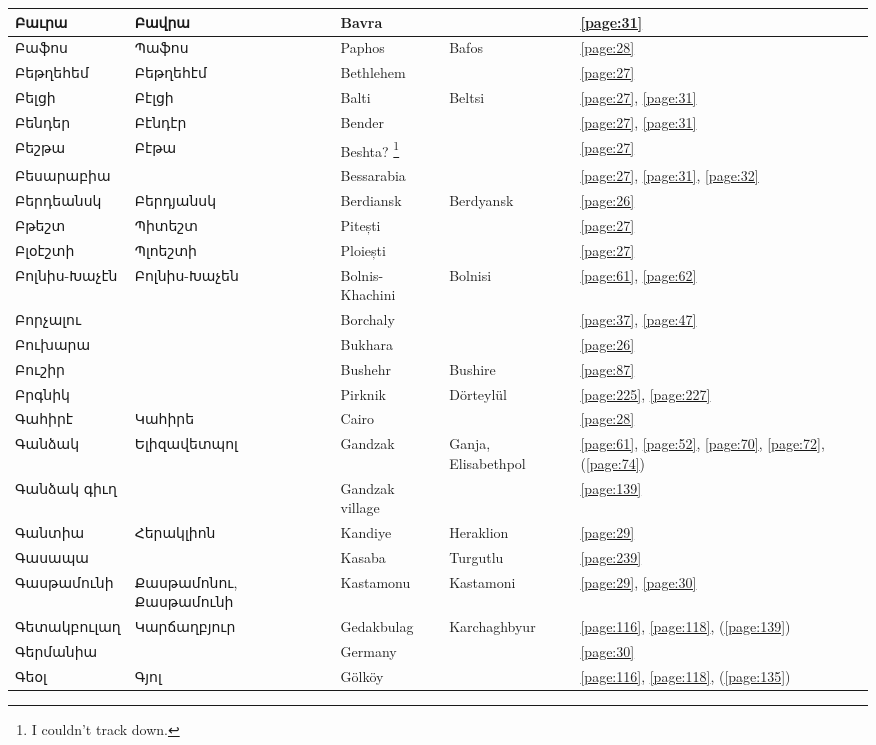 \begin{center}
\begin{longtable}{|p{}|p{3cm}|p{3cm}|p{2cm}|p{3cm}|}
Բաւրա& Բավրա
& {Bavra}& &\ref{page:31}\\ \hline
Բաֆոս&Պաֆոս
& {Paphos}& Bafos&\ref{page:28}\\ \hline
Բեթղեհեմ&Բեթղեհէմ &
Bethlehem& &\ref{page:27}\\ \hline
Բելցի& Բէլցի&
{Balti}& Beltsi&\ref{page:27}, \ref{page:31}\\ \hline
Բենդեր& Բէնդէր&
{Bender}& &\ref{page:27}, \ref{page:31}\\ \hline
Բեշթա& Բէթա& 
{Beshta?} \footnote{I couldn't track down.}& &\ref{page:27}\\ \hline
Բեսարաբիա&  &Bessarabia & &\ref{page:27}, \ref{page:31}, \ref{page:32}\\ \hline
Բերդեանսկ&Բերդյանսկ &
{Berdiansk}&Berdyansk &\ref{page:26}\\ \hline
Բթեշտ&Պիտեշտ 
&{Pitești}  &    &\ref{page:27}\\ \hline
Բլօէշտի& Պլոեշտի
&{Ploiești}& &\ref{page:27}\\ \hline
Բոլնիս-Խաչէն& Բոլնիս-Խաչեն
& Bolnis-Khachini& Bolnisi&\ref{page:61}, \ref{page:62}\\ \hline
Բորչալու& 
&{Borchaly} & &\ref{page:37}, \ref{page:47}\\ \hline
Բուխարա& &
{Bukhara}& &\ref{page:26}\\ \hline
Բուշիր& & 
{Bushehr}&Bushire &\ref{page:87}\\ \hline
Բրգնիկ& &
{Pirknik}& Dörteylül& \ref{page:225}, \ref{page:227}\\ \hline
Գահիրէ& Կահիրե
&Cairo & &\ref{page:28}\\ \hline
Գանձակ& Ելիզավետպոլ& 
Gandzak & Ganja, Elisabethpol&\ref{page:61}, \ref{page:52}, \ref{page:70}, \ref{page:72}, (\ref{page:74})\\ \hline
Գանձակ գիւղ& &
Gandzak village& &\ref{page:139}\\ \hline
Գանտիա& Հերակլիոն& 
{Kandiye}&Heraklion  & \ref{page:29}\\ \hline
Գասապա& & 
{Kasaba}& Turgutlu&\ref{page:239}\\ \hline
Գասթամունի& Քասթամոնու, Քասթամունի&
  Kastamonu& Kastamoni& \ref{page:29}, \ref{page:30}\\ \hline
Գետակբուլաղ&Կարճաղբյուր 
& {Gedakbulag}&Karchaghbyur &\ref{page:116}, \ref{page:118}, (\ref{page:139})\\ \hline
Գերմանիա& & 
Germany& &\ref{page:30}\\ \hline
Գեօլ&Գյոլ
&{Gölköy} & &\ref{page:116}, \ref{page:118}, (\ref{page:135})\\ \hline

\end{longtable}
\end{center}
